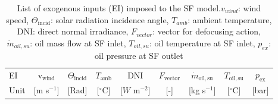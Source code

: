 \documentclass[final,3p,times,review]{elsarticle}
\begin{document}
\begin{table}[h!]
\centering
\caption{List of exogenous inputs (EI) imposed to the SF model.$v_{wind}$: wind speed, $\Theta_\mathrm{incid}$: solar radiation incidence angle, $T_{amb}$: ambient temperature, DNI: direct normal irradiance, $F_{vector}$: vector for defocusing action, $\dot{m}_{oil,su}$: oil mass flow at SF inlet,  $T_{oil,su}$: oil temperature at SF inlet, $p_{ex}$: oil pressure at SF outlet}
\begin{tabular}{lcccccccc}
\toprule
EI   & v$_\mathrm{wind}$   & $\Theta_\mathrm{incid}$ & $T_\mathrm{amb}$      & DNI                & $F_\mathrm{vector}$   & $\dot{m}_\mathrm{oil,su}$ & $T_\mathrm{oil,su}$   & $p_\mathrm{ex}$ \\
Unit & [m s$^{-1}$] & [Rad]    &  [$^{\circ}$C] &  [$W$ m$^{-2}$]      & [-]            &  [kg s$^{-1}$]     &  [$^{\circ}$C] &  [bar] \\
\bottomrule
\end{tabular}
\label{Tab:SF_Inputs}
\end{table}
%
\end{document}
